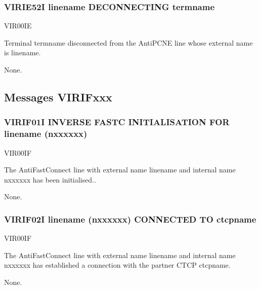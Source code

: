 \documentclass[letterpaper,10pt,english]{sphinxmanual}
\begin{document}
\subsubsection{VIRIE52I linename DECONNECTING termname}
\label{\detokenize{messages:virie52i-linename-deconnecting-termname}}\begin{description}
\sphinxAtStartPar
VIR00IE

\sphinxAtStartPar
Terminal termname disconnected from the AntiPCNE line whose external name is linename.

\sphinxAtStartPar
None.

\end{description}


\subsection{Messages VIRIFxxx}
\label{\detokenize{messages:messages-virifxxx}}

\subsubsection{VIRIF01I INVERSE FASTC INITIALISATION FOR linename (n\sphinxhyphen{}xxxxxx)}
\label{\detokenize{messages:virif01i-inverse-fastc-initialisation-for-linename-n-xxxxxx}}\begin{description}
\sphinxAtStartPar
VIR00IF

\sphinxAtStartPar
The AntiFastConnect line with external name linename and internal name n\sphinxhyphen{}xxxxxx has been initialised..

\sphinxAtStartPar
None.

\end{description}


\subsubsection{VIRIF02I linename (n\sphinxhyphen{}xxxxxx) CONNECTED TO ctcpname}
\label{\detokenize{messages:virif02i-linename-n-xxxxxx-connected-to-ctcpname}}\begin{description}
\sphinxAtStartPar
VIR00IF

\sphinxAtStartPar
The AntiFastConnect line with external name linename and internal name n\sphinxhyphen{}xxxxxx has established a connection with the partner CTCP ctcpname.

\sphinxAtStartPar
None.

\end{description}
\end{document}
